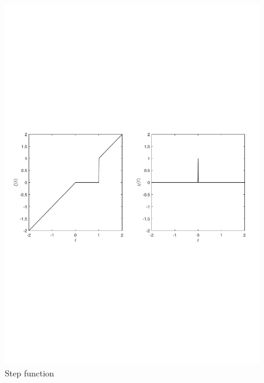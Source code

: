 \documentclass[11pt,a4paper]{article}
\begin{document}
\begin{figure}[h]
\centering
\includegraphics[scale=0.75]{figures/fig9.pdf}
\caption{ Step function \label{fig:stepfunction}}
\end{figure}
\end{document}
